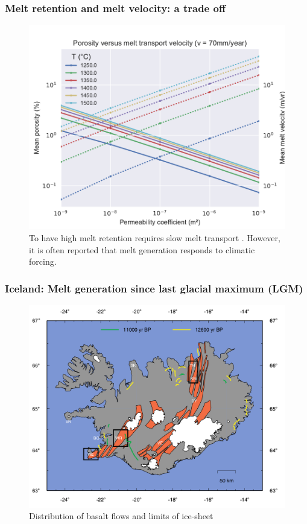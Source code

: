 \documentclass[aspectratio=169]{beamer}
\begin{document}
\begin{frame}
    \frametitle{Melt retention and melt velocity: a trade off}
    \begin{figure}
        \includegraphics[height=0.7\paperheight]{./figures/ch2-phi-vm.pdf}
        \caption{To have high melt retention requires slow melt transport \citep{franken-etal-2020}. However, it is
                 often reported that melt generation responds to climatic forcing.}
    \end{figure}
\end{frame}

\begin{frame}
    \frametitle{Iceland: Melt generation since last glacial maximum (LGM)}
    \begin{figure}
        \includegraphics[height=.65\paperheight]{./figures/iceland-map.png}
        \caption{Distribution of basalt flows and limits of ice-sheet \citep{maclennan-etal-2002}}
    \end{figure}
\end{frame}
\end{document}
